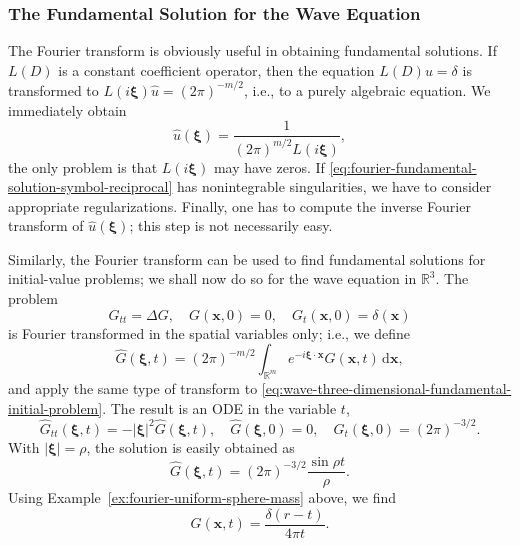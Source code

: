 \subsubsection{The Fundamental Solution for the Wave Equation}\label{subsec:wave-fourier-fundamental}

The Fourier transform is obviously useful in obtaining fundamental solutions. If $L(D)$ is a constant coefficient operator, then the equation $L(D)u=\delta$ is transformed to $L(i\bm{\xi})\widehat u=(2\pi)^{-m/2}$, i.e., to a purely algebraic equation. We immediately obtain
\begin{equation}\label{eq:fourier-fundamental-solution-symbol-reciprocal}
\widehat u(\bm{\xi})=\dfrac1{(2\pi)^{m/2}L(i\bm{\xi})},
\end{equation}
the only problem is that $L(i\bm{\xi})$ may have zeros. If \eqref{eq:fourier-fundamental-solution-symbol-reciprocal} has nonintegrable singularities, we have to consider appropriate regularizations. Finally, one has to compute the inverse Fourier transform of $\widehat u(\bm{\xi})$; this step is not necessarily easy.

Similarly, the Fourier transform can be used to find fundamental solutions for initial-value problems; we shall now do so for the wave equation in $\mathbb{R}^3$. The problem
\begin{equation}\label{eq:wave-three-dimensional-fundamental-initial-problem}
G_{tt}=\Delta G,\quad G(\bm{x},0)=0,\quad G_t(\bm{x},0)=\delta(\bm{x})
\end{equation}
is Fourier transformed in the spatial variables only; i.e., we define
\begin{equation}\label{eq:wave-spatial-fourier-transform}
\widehat G(\bm{\xi},t)=(2\pi)^{-m/2}\int_{\mathbb{R}^m}e^{-i\bm{\xi}\cdot\bm{x}}G(\bm{x},t)\,\mathrm{d}\bm{x},
\end{equation}
and apply the same type of transform to \eqref{eq:wave-three-dimensional-fundamental-initial-problem}. The result is an ODE in the variable $t$,
\begin{equation}\label{eq:wave-fourier-transformed-oscillator-problem}
\widehat G_{tt}(\bm{\xi},t)=-|\bm{\xi}|^2\widehat G(\bm{\xi},t),\quad\widehat G(\bm{\xi},0)=0,\quad\widehat G_t(\bm{\xi},0)=(2\pi)^{-3/2}.
\end{equation}
With $|\bm{\xi}|=\rho$, the solution is easily obtained as
\begin{equation}\label{eq:wave-fourier-oscillator-solution}
\widehat G(\bm{\xi},t)=(2\pi)^{-3/2}\dfrac{\sin\rho t}\rho.
\end{equation}
Using Example~\ref{ex:fourier-uniform-sphere-mass} above, we find
\begin{equation}\label{eq:wave-three-dimensional-spherical-delta}
G(\bm{x},t)=\dfrac{\delta(r-t)}{4\pi t}.
\end{equation}


